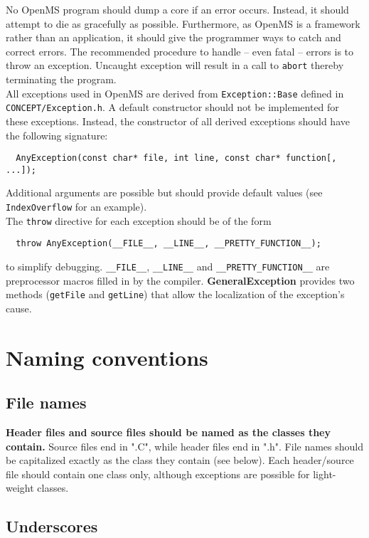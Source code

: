 \documentclass[a4]{article}
\begin{document}
No OpenMS program should dump a core if an error occurs. Instead, it should
attempt to die as gracefully as possible. Furthermore, as OpenMS is a
framework rather than an application, it should give the programmer ways to
catch and correct errors.
The recommended procedure to handle -- even fatal -- errors is to throw an exception. Uncaught
exception will result in a call to {\tt abort} thereby terminating the
program.\\
All exceptions used in OpenMS are derived from \texttt{Exception::Base}
defined in \texttt{CONCEPT/Exception.h}. A default constructor should not be
implemented for these exceptions. Instead, the constructor of all derived
exceptions should have the following signature:
\begin{verbatim}
  AnyException(const char* file, int line, const char* function[, ...]);
\end{verbatim}
Additional arguments are possible but should provide default values (see
{\tt IndexOverflow} for an example).\\
The {\tt throw} directive for each exception should be of the form
\begin{verbatim}
  throw AnyException(__FILE__, __LINE__, __PRETTY_FUNCTION__);
\end{verbatim}
to simplify debugging. {\tt \_\_FILE\_\_}, {\tt \_\_LINE\_\_} and {\tt \_\_PRETTY\_FUNCTION\_\_} are preprocessor
macros filled in by the compiler. {\bf GeneralException} provides two methods
({\tt getFile} and {\tt getLine}) that allow the localization of the
exception's cause.\\

\section{Naming conventions}

\subsection{File names}
{\bf Header files and source files should be named as the classes they
contain.}
Source files end in ".C", while header files end in ".h". File names should be
capitalized exactly as the class they contain (see below). Each header/source
file should contain one class only, although exceptions are possible for
light-weight classes.


\subsection{Underscores}
\end{document}
